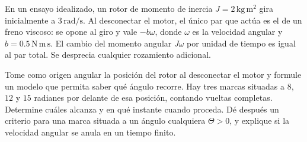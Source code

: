En un ensayo idealizado, un rotor de momento de inercia \(J=2\,\mathrm{kg\,m^2}\) gira inicialmente a \(3\,\mathrm{rad/s}\). Al desconectar el motor, el único par que actúa es el de un freno viscoso: se opone al giro y vale \(-b\omega\), donde \(\omega\) es la velocidad angular y \(b=0.5\,\mathrm{N\,m\,s}\). El cambio del momento angular \(J\omega\) por unidad de tiempo es igual al par total. Se desprecia cualquier rozamiento adicional.

Tome como origen angular la posición del rotor al desconectar el motor y formule un modelo que permita saber qué ángulo recorre. Hay tres marcas situadas a \(8\), \(12\) y \(15\) radianes por delante de esa posición, contando vueltas completas. Determine cuáles alcanza y en qué instante cuando proceda. Dé después un criterio para una marca situada a un ángulo cualquiera \(\Theta>0\), y explique si la velocidad angular se anula en un tiempo finito.

